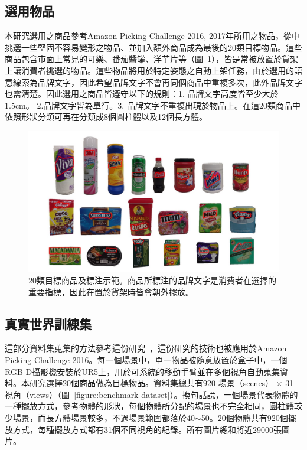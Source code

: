 \subsection{選用物品}
本研究選用之商品參考Amazon Picking Challenge 2016, 2017年所用之物品，從中挑選一些堅固不容易變形之物品、並加入額外商品成為最後的20類目標物品。這些商品包含市面上常見的可樂、番茄醬罐、洋芋片等（圖~\ref{figure:20_products}），皆是常被放置於貨架上讓消費者挑選的物品。這些物品將用於特定姿態之自動上架任務，由於選用的語意線索為品牌文字，因此希望品牌文字不會再同個商品中重複多次，此外品牌文字也需清楚。因此選用之商品皆遵守以下的規則：1. 品牌文字高度皆至少大於1.5cm。 2.品牌文字皆為單行。3. 品牌文字不重複出現於物品上。在這20類商品中依照形狀分類可再在分類成8個圓柱體以及12個長方體。


\begin{figure}[H]
	\centering
	\includegraphics[height=!, width=1.0\linewidth, keepaspectratio=true]
	{./figures/20_products.jpg}
  \caption{20類目標商品及標注示範。商品所標注的品牌文字是消費者在選擇的重要指標，因此在置於貨架時皆會朝外擺放。}
  \label{figure:20_products}
\end{figure}


\subsection{真實世界訓練集}
這部分資料集蒐集的方法參考這份研究~\cite{zeng2016multi}，這份研究的技術也被應用於Amazon Picking Challenge 2016。每一個場景中，單一物品被隨意放置於盒子中，一個RGB-D攝影機安裝於UR5上，用於可系統的移動手臂並在多個視角自動蒐集資料。本研究選擇20個商品做為目標物品。資料集總共有920 場景（scenes） $\times$ 31 視角（views）（圖~\ref{figure:benchmark-dataset}）。換句話說，一個場景代表物體的一種擺放方式，參考物體的形狀，每個物體所分配的場景也不完全相同，圓柱體較少場景，而長方體場景較多，不過場景範圍都落於40$\sim$50。20個物體共有920個擺放方式，每種擺放方式都有31個不同視角的紀錄。所有圖片總和將近29000張圖片。



